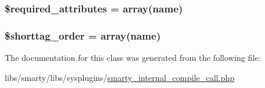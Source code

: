 \subsubsection[{\$required\+\_\+attributes}]{\setlength{\rightskip}{0pt plus 5cm}\$required\+\_\+attributes = array(\textquotesingle{}name\textquotesingle{})}\label{class_smarty___internal___compile___call_ae799507d5461de485f3a618abeecea95}
\hypertarget{class_smarty___internal___compile___call_a2ccb25269c3a92e8c4796c7ef23725e6}{}
\subsubsection[{\$shorttag\+\_\+order}]{\setlength{\rightskip}{0pt plus 5cm}\$shorttag\+\_\+order = array(\textquotesingle{}name\textquotesingle{})}\label{class_smarty___internal___compile___call_a2ccb25269c3a92e8c4796c7ef23725e6}


The documentation for this class was generated from the following file\+:\begin{DoxyCompactItemize}
\item 
libs/smarty/libs/sysplugins/\hyperlink{smarty__internal__compile__call_8php}{smarty\+\_\+internal\+\_\+compile\+\_\+call.\+php}\end{DoxyCompactItemize}
